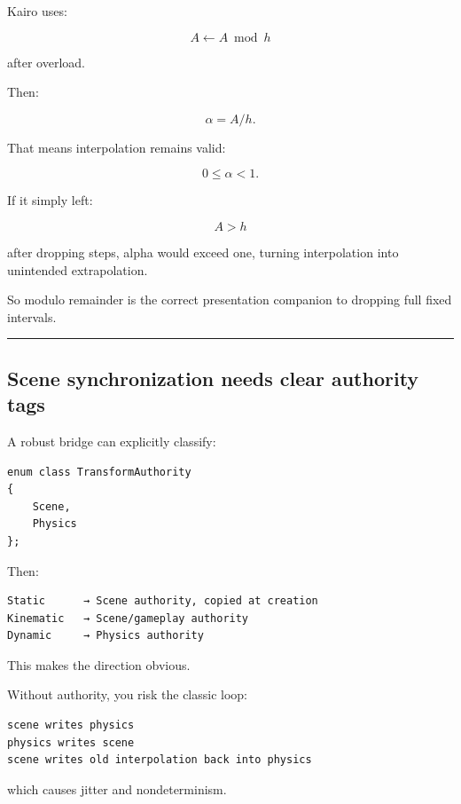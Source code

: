 \hypertarget{06-engine-ii-ch038-interpolation-alpha-after-dropping-time}{}

Kairo uses:

\[
A\leftarrow A\bmod h
\]

after overload.

Then:

\[
\alpha=A/h.
\]

That means interpolation remains valid:

\[
0\le\alpha<1.
\]

If it simply left:

\[
A>h
\]

after dropping steps, alpha would exceed one, turning interpolation into unintended extrapolation.

So modulo remainder is the correct presentation companion to dropping full fixed intervals.

\begin{center}\rule{0.5\linewidth}{0.5pt}\end{center}

\subsection{Scene synchronization needs clear authority tags}\label{06-engine-ii-ch038-scene-synchronization-needs-clear-authority-tags}

\hypertarget{06-engine-ii-ch038-scene-synchronization-needs-clear-authority-tags}{}

A robust bridge can explicitly classify:

\begin{verbatim}
enum class TransformAuthority
{
    Scene,
    Physics
};
\end{verbatim}

Then:

\begin{verbatim}
Static      → Scene authority, copied at creation
Kinematic   → Scene/gameplay authority
Dynamic     → Physics authority
\end{verbatim}

This makes the direction obvious.

Without authority, you risk the classic loop:

\begin{verbatim}
scene writes physics
physics writes scene
scene writes old interpolation back into physics
\end{verbatim}

which causes jitter and nondeterminism.

